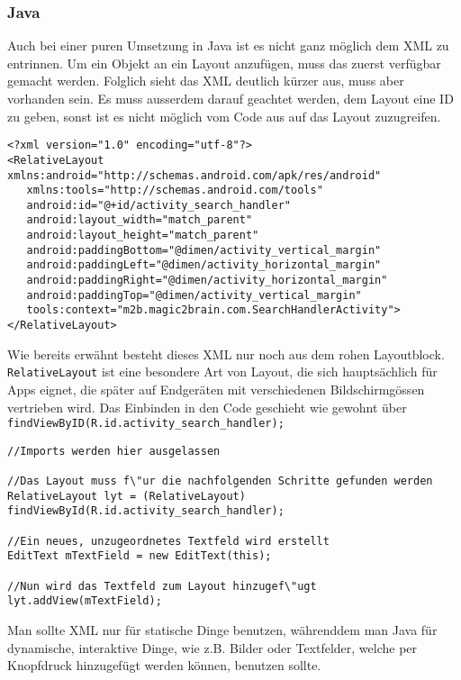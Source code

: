 \subsubsection*{Java}
Auch bei einer puren Umsetzung in Java ist es nicht ganz möglich dem XML zu entrinnen. Um ein Objekt an ein Layout anzufügen, muss das zuerst verfügbar gemacht werden.
Folglich sieht das XML deutlich kürzer aus, muss aber vorhanden sein. Es muss ausserdem darauf geachtet werden, dem Layout eine ID zu geben, sonst ist es nicht möglich vom Code aus auf das Layout zuzugreifen.
\begin{lstlisting}
<?xml version="1.0" encoding="utf-8"?>
<RelativeLayout xmlns:android="http://schemas.android.com/apk/res/android"
   xmlns:tools="http://schemas.android.com/tools"
   android:id="@+id/activity_search_handler"
   android:layout_width="match_parent"
   android:layout_height="match_parent"
   android:paddingBottom="@dimen/activity_vertical_margin"
   android:paddingLeft="@dimen/activity_horizontal_margin"
   android:paddingRight="@dimen/activity_horizontal_margin"
   android:paddingTop="@dimen/activity_vertical_margin"
   tools:context="m2b.magic2brain.com.SearchHandlerActivity">
</RelativeLayout>
\end{lstlisting}

Wie bereits erwähnt besteht dieses XML nur noch aus dem rohen Layoutblock. \verb|RelativeLayout|  ist eine besondere Art von Layout, die sich hauptsächlich für Apps eignet, die später auf Endgeräten mit verschiedenen Bildschirmgössen vertrieben wird.
Das Einbinden in den Code geschieht wie gewohnt über\\ \verb|findViewByID(R.id.activity_search_handler);| 

\begin{lstlisting}
//Imports werden hier ausgelassen

//Das Layout muss f\"ur die nachfolgenden Schritte gefunden werden
RelativeLayout lyt = (RelativeLayout) findViewById(R.id.activity_search_handler);

//Ein neues, unzugeordnetes Textfeld wird erstellt
EditText mTextField = new EditText(this);

//Nun wird das Textfeld zum Layout hinzugef\"ugt
lyt.addView(mTextField);
\end{lstlisting}

Man sollte XML nur für statische Dinge benutzen, währenddem man Java für dynamische, interaktive Dinge, wie z.B. Bilder oder Textfelder, welche per Knopfdruck hinzugefügt werden können, benutzen sollte.

